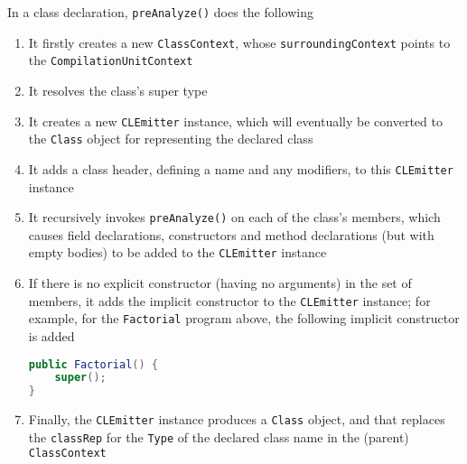 \documentclass[8pt,a4paper,compress]{beamer}
\begin{document}
\begin{frame}[fragile]
\pause

In a class declaration, \lstinline{preAnalyze()} does the following
\begin{enumerate}
\item It firstly creates a new \lstinline{ClassContext}, whose \lstinline{surroundingContext} points to the \lstinline{CompilationUnitContext}
\item It resolves the class's super type
\item It creates a new \lstinline{CLEmitter} instance, which will eventually be converted to the \lstinline{Class} object for representing the declared class
\item It adds a class header, defining a name and any modifiers, to this \lstinline{CLEmitter} instance
\item It recursively invokes \lstinline{preAnalyze()} on each of the class's members, which causes field declarations, constructors and method declarations (but with empty bodies) to be added to the \lstinline{CLEmitter} instance
\item If there is no explicit constructor (having no arguments) in the set of members, it adds the implicit constructor to the \lstinline{CLEmitter} instance; for example, for the \lstinline{Factorial} program above, the following implicit constructor is added
\begin{lstlisting}[language=Java]
public Factorial() {
    super();
}
\end{lstlisting}
\item Finally, the \lstinline{CLEmitter} instance produces a \lstinline{Class} object, and that replaces the \lstinline{classRep} for the \lstinline{Type} of the declared class name in the (parent) \lstinline{ClassContext}
\end{enumerate}
\end{frame}
\end{document}
